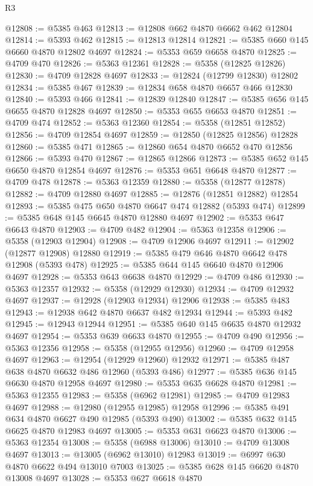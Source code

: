 \begin{lexlean}{R3}
\begin{coremodule}
@12808 := @5385 @463
@12813 := @12808 @662 @4870 @6662 @462 @12804
@12814 := @5393 @462
@12815 := @12813 @12814
@12821 := @5385 @660 @145 @6660 @4870 @12802 @4697
@12824 := @5353 @659 @6658 @4870
@12825 := @4709 @470
@12826 := @5363 @12361
@12828 := @5358 (@12825 @12826)
@12830 := @4709 @12828 @4697
@12833 := @12824 (@12799 @12830) @12802
@12834 := @5385 @467
@12839 := @12834 @658 @4870 @6657 @466 @12830
@12840 := @5393 @466
@12841 := @12839 @12840
@12847 := @5385 @656 @145 @6655 @4870 @12828 @4697
@12850 := @5353 @655 @6653 @4870
@12851 := @4709 @474
@12852 := @5363 @12360
@12854 := @5358 (@12851 @12852)
@12856 := @4709 @12854 @4697
@12859 := @12850 (@12825 @12856) @12828
@12860 := @5385 @471
@12865 := @12860 @654 @4870 @6652 @470 @12856
@12866 := @5393 @470
@12867 := @12865 @12866
@12873 := @5385 @652 @145 @6650 @4870 @12854 @4697
@12876 := @5353 @651 @6648 @4870
@12877 := @4709 @478
@12878 := @5363 @12359
@12880 := @5358 (@12877 @12878)
@12882 := @4709 @12880 @4697
@12885 := @12876 (@12851 @12882) @12854
@12893 := @5385 @475 @650 @4870 @6647 @474 @12882 (@5393 @474)
@12899 := @5385 @648 @145 @6645 @4870 @12880 @4697
@12902 := @5353 @647 @6643 @4870
@12903 := @4709 @482
@12904 := @5363 @12358
@12906 := @5358 (@12903 @12904)
@12908 := @4709 @12906 @4697
@12911 := @12902 (@12877 @12908) @12880
@12919 := @5385 @479 @646 @4870 @6642 @478 @12908 (@5393 @478)
@12925 := @5385 @644 @145 @6640 @4870 @12906 @4697
@12928 := @5353 @643 @6638 @4870
@12929 := @4709 @486
@12930 := @5363 @12357
@12932 := @5358 (@12929 @12930)
@12934 := @4709 @12932 @4697
@12937 := @12928 (@12903 @12934) @12906
@12938 := @5385 @483
@12943 := @12938 @642 @4870 @6637 @482 @12934
@12944 := @5393 @482
@12945 := @12943 @12944
@12951 := @5385 @640 @145 @6635 @4870 @12932 @4697
@12954 := @5353 @639 @6633 @4870
@12955 := @4709 @490
@12956 := @5363 @12356
@12958 := @5358 (@12955 @12956)
@12960 := @4709 @12958 @4697
@12963 := @12954 (@12929 @12960) @12932
@12971 := @5385 @487 @638 @4870 @6632 @486 @12960 (@5393 @486)
@12977 := @5385 @636 @145 @6630 @4870 @12958 @4697
@12980 := @5353 @635 @6628 @4870
@12981 := @5363 @12355
@12983 := @5358 (@6962 @12981)
@12985 := @4709 @12983 @4697
@12988 := @12980 (@12955 @12985) @12958
@12996 := @5385 @491 @634 @4870 @6627 @490 @12985 (@5393 @490)
@13002 := @5385 @632 @145 @6625 @4870 @12983 @4697
@13005 := @5353 @631 @6623 @4870
@13006 := @5363 @12354
@13008 := @5358 (@6988 @13006)
@13010 := @4709 @13008 @4697
@13013 := @13005 (@6962 @13010) @12983
@13019 := @6997 @630 @4870 @6622 @494 @13010 @7003
@13025 := @5385 @628 @145 @6620 @4870 @13008 @4697
@13028 := @5353 @627 @6618 @4870

\end{coremodule}
\end{lexlean}
